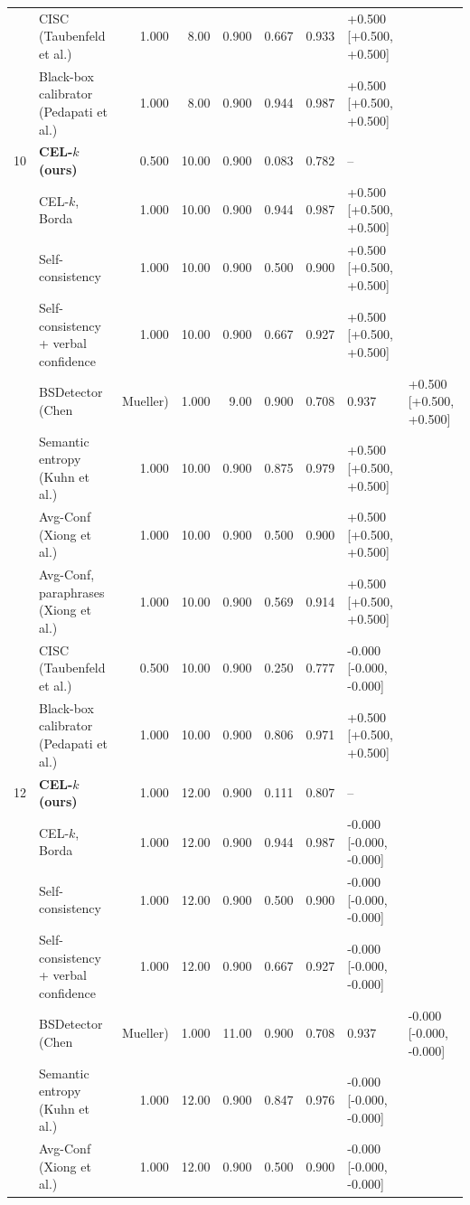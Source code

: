 \begin{table}[t]
\begin{tabular}{llrrrrrl}
 & CISC (Taubenfeld et al.) & 1.000 & 8.00 & 0.900 & 0.667 & 0.933 & +0.500 [+0.500, +0.500] \\
 & Black-box calibrator (Pedapati et al.) & 1.000 & 8.00 & 0.900 & 0.944 & 0.987 & +0.500 [+0.500, +0.500] \\
10 & \textbf{CEL-$k$ (ours)} & 0.500 & 10.00 & 0.900 & 0.083 & 0.782 & -- \\
 & \quad CEL-$k$, Borda & 1.000 & 10.00 & 0.900 & 0.944 & 0.987 & +0.500 [+0.500, +0.500] \\
 & Self-consistency & 1.000 & 10.00 & 0.900 & 0.500 & 0.900 & +0.500 [+0.500, +0.500] \\
 & Self-consistency + verbal confidence & 1.000 & 10.00 & 0.900 & 0.667 & 0.927 & +0.500 [+0.500, +0.500] \\
 & BSDetector (Chen & Mueller) & 1.000 & 9.00 & 0.900 & 0.708 & 0.937 & +0.500 [+0.500, +0.500] \\
 & Semantic entropy (Kuhn et al.) & 1.000 & 10.00 & 0.900 & 0.875 & 0.979 & +0.500 [+0.500, +0.500] \\
 & Avg-Conf (Xiong et al.) & 1.000 & 10.00 & 0.900 & 0.500 & 0.900 & +0.500 [+0.500, +0.500] \\
 & Avg-Conf, paraphrases (Xiong et al.) & 1.000 & 10.00 & 0.900 & 0.569 & 0.914 & +0.500 [+0.500, +0.500] \\
 & CISC (Taubenfeld et al.) & 0.500 & 10.00 & 0.900 & 0.250 & 0.777 & -0.000 [-0.000, -0.000] \\
 & Black-box calibrator (Pedapati et al.) & 1.000 & 10.00 & 0.900 & 0.806 & 0.971 & +0.500 [+0.500, +0.500] \\
12 & \textbf{CEL-$k$ (ours)} & 1.000 & 12.00 & 0.900 & 0.111 & 0.807 & -- \\
 & \quad CEL-$k$, Borda & 1.000 & 12.00 & 0.900 & 0.944 & 0.987 & -0.000 [-0.000, -0.000] \\
 & Self-consistency & 1.000 & 12.00 & 0.900 & 0.500 & 0.900 & -0.000 [-0.000, -0.000] \\
 & Self-consistency + verbal confidence & 1.000 & 12.00 & 0.900 & 0.667 & 0.927 & -0.000 [-0.000, -0.000] \\
 & BSDetector (Chen & Mueller) & 1.000 & 11.00 & 0.900 & 0.708 & 0.937 & -0.000 [-0.000, -0.000] \\
 & Semantic entropy (Kuhn et al.) & 1.000 & 12.00 & 0.900 & 0.847 & 0.976 & -0.000 [-0.000, -0.000] \\
 & Avg-Conf (Xiong et al.) & 1.000 & 12.00 & 0.900 & 0.500 & 0.900 & -0.000 [-0.000, -0.000] \\

\end{tabular}
\end{table}
